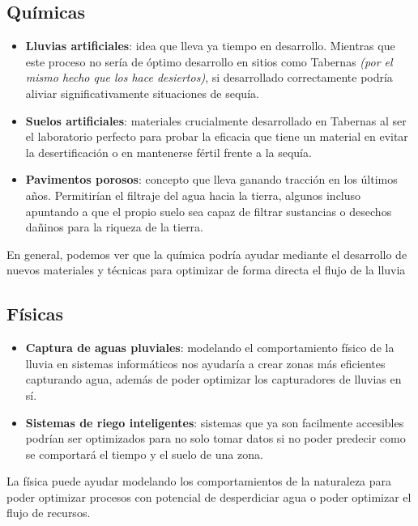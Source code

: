 \documentclass{article}
\begin{document}
\subsection{Químicas}
\begin{itemize}
    \item \textbf{Lluvias artificiales}: idea que lleva ya tiempo en desarrollo. Mientras que este proceso no sería de óptimo
    desarrollo en sitios como Tabernas \textit{(por el mismo hecho que los hace desiertos)}, si desarrollado correctamente
    podría aliviar significativamente situaciones de sequía.
    \item \textbf{Suelos artificiales}: materiales crucialmente desarrollado en Tabernas al ser el laboratorio perfecto
    para probar la eficacia que tiene un material en evitar la desertificación o en mantenerse fértil frente a la
    sequía.
    \item \textbf{Pavimentos porosos}: concepto que lleva ganando tracción en los últimos años. Permitirían el filtraje
    del agua hacia la tierra, algunos incluso apuntando a que el propio suelo sea capaz de filtrar sustancias o desechos
    dañinos para la riqueza de la tierra.
\end{itemize}
En general, podemos ver que la química podría ayudar mediante el desarrollo de nuevos materiales y técnicas para 
optimizar de forma directa el flujo de la lluvia

\subsection{Físicas}
\begin{itemize}
    \item \textbf{Captura de aguas pluviales}: modelando el comportamiento físico de la lluvia en sistemas informáticos
    nos ayudaría a crear zonas más eficientes capturando agua, además de poder optimizar los capturadores de lluvias 
    en sí.
    \item \textbf{Sistemas de riego inteligentes}: sistemas que ya son facilmente accesibles podrían ser optimizados 
    para no solo tomar datos si no poder predecir como se comportará el tiempo y el suelo de una zona.
\end{itemize}
La física puede ayudar modelando los comportamientos de la naturaleza para poder optimizar procesos con potencial de 
desperdiciar agua o poder optimizar el flujo de recursos.
\end{document}
